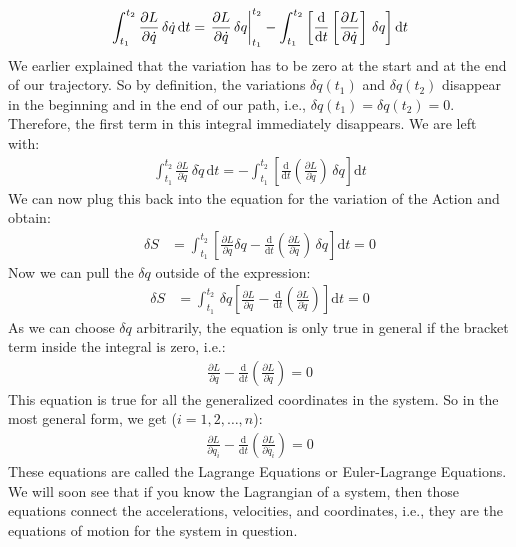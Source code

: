     \begin{align}
        \int_{t_1}^{t_2}\frac{\partial L}{\partial \dot{q}}\,\delta\dot{q}\,\text{d}t=\eval{\frac{\partial L}{\partial \dot{q}}\,\delta q}_{t_1}^{t_2}-\int_{t_1}^{t_2}\left[\frac{\text{d}}{\text{d}t}\left[\frac{\partial L}{\partial \dot{q}}\right]\,\delta q\right]\text{d}t
    \end{align}
    We earlier explained that the variation has to be zero at the start and at the end of our trajectory. So by definition, the variations $\delta q(t_1)$ and $\delta q(t_2)$ disappear in the beginning and in the end of our path, i.e., $\delta q(t_1) = \delta q(t_2) = 0$. Therefore, the first term in this integral immediately disappears. We are left with: 
    \begin{align}
        \int_{t_1}^{t_2}\frac{\partial L}{\partial \dot{q}}\,\delta\dot{q}\,\text{d}t = -\int_{t_1}^{t_2}\left[\frac{\text{d}}{\text{d}t}\left(\frac{\partial L}{\partial \dot{q}}\right)\,\delta q\right]\text{d}t
    \end{align}
    We can now plug this back into the equation for the variation of the Action and obtain:
\begin{align}
    \delta S &= \int_{t_1}^{t_2} \left[\frac{\partial L}{\partial q}\delta q -\frac{\text{d}}{\text{d}t}\left(\frac{\partial L}{\partial \dot{q}}\right)\,\delta q \right] \text{d}t=0 
\end{align}
    Now we can pull the $\delta q$ outside of the expression: 
    \begin{align}
    \delta S &= \int_{t_1}^{t_2} \,\delta q \left[\frac{\partial L}{\partial q} -\frac{\text{d}}{\text{d}t}\left(\frac{\partial L}{\partial \dot{q}}\right)\right] \text{d}t=0 
    \end{align}
    As we can choose $\delta q$ arbitrarily, the equation is only true in general if the bracket term inside the integral is zero, i.e.: 
    \begin{align}
        \frac{\partial L}{\partial q}-\frac{\text{d}}{\text{d}t}\left(\frac{\partial L}{\partial \dot{q}}\right) = 0
    \end{align} 
    This equation is true for all the generalized coordinates in the system. So in the most general form, we get ($i=1,2, \dots ,n$):
    \begin{align}
        \frac{\partial L}{\partial q_i}-\frac{\text{d}}{\text{d}t}\left(\frac{\partial L}{\partial \dot{q_i}}\right) = 0
    \end{align}
    These equations are called the Lagrange Equations or Euler-Lagrange Equations.
    We will soon see that if you know the Lagrangian of a system, then those equations connect the accelerations, velocities, and coordinates, i.e., they are the equations of motion for the system in question.
    
